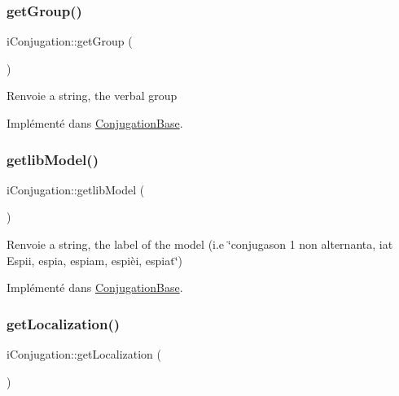 \subsubsection{\texorpdfstring{get\+Group()}{getGroup()}}
{\footnotesize\ttfamily i\+Conjugation\+::get\+Group (\begin{DoxyParamCaption}{ }\end{DoxyParamCaption})}

\begin{DoxyReturn}{Renvoie}
a string, the verbal group 
\end{DoxyReturn}


Implémenté dans \hyperlink{class_conjugation_base_aa88c93007f333b916a6a51819e50e8ae}{Conjugation\+Base}.

\hypertarget{interfacei_conjugation_a2b6dd0a979a98bc50f6f9f7ec9b69e63}{}\label{interfacei_conjugation_a2b6dd0a979a98bc50f6f9f7ec9b69e63} 
\subsubsection{\texorpdfstring{getlib\+Model()}{getlibModel()}}
{\footnotesize\ttfamily i\+Conjugation\+::getlib\+Model (\begin{DoxyParamCaption}{ }\end{DoxyParamCaption})}

\begin{DoxyReturn}{Renvoie}
a string, the label of the model (i.\+e \char`\"{}conjugason 1 non alternanta, iat Espii, espia, espiam, espièi, espiat\char`\"{}) 
\end{DoxyReturn}


Implémenté dans \hyperlink{class_conjugation_base_a52db22137154c2fd7a8487406b959652}{Conjugation\+Base}.

\hypertarget{interfacei_conjugation_ab19ceb5ab295fd3d0f862d963379a7e2}{}\label{interfacei_conjugation_ab19ceb5ab295fd3d0f862d963379a7e2} 
\subsubsection{\texorpdfstring{get\+Localization()}{getLocalization()}}
{\footnotesize\ttfamily i\+Conjugation\+::get\+Localization (\begin{DoxyParamCaption}{ }\end{DoxyParamCaption})}

